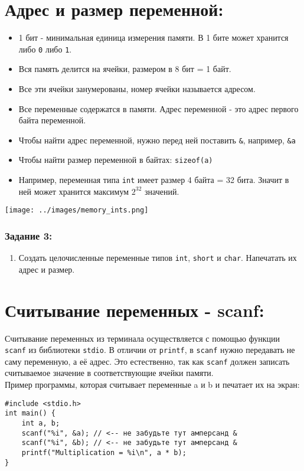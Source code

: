 \documentclass{article}
\begin{document}
\section*{Адрес и размер переменной:}
\begin{itemize}
\item 1 бит - минимальная единица измерения памяти. В 1 бите может хранится либо \texttt{0} либо \texttt{1}.
\item Вся память делится на ячейки, размером в 8 бит = 1 байт.
\item Все эти ячейки занумерованы, номер ячейки называется адресом.
\item Все переменные содержатся в памяти. Адрес переменной - это адрес первого байта переменной.
\item Чтобы найти адрес переменной, нужно перед ней поставить \texttt{\&}, например, \texttt{\&a}
\item Чтобы найти размер переменной в байтах: \texttt{sizeof(a)}
\item Например, переменная типа \texttt{int} имеет размер 4 байта = 32 бита. Значит в ней может хранится максимум $2^{32}$ значений.
\end{itemize}

\texttt{[image: ../images/memory\_ints.png]}

\subsubsection*{Задание 3:}
\begin{enumerate}
\item Создать целочисленные переменные типов \texttt{int}, \texttt{short} и \texttt{char}. Напечатать их адрес и размер.
\end{enumerate}

\section*{Считывание переменных - scanf:}
Считывание переменных из терминала осуществляется с помощью функции \texttt{scanf} из библиотеки \texttt{stdio}. В отличии от \texttt{printf}, в \texttt{scanf} нужно передавать не саму переменную, а её адрес. Это естественно, так как \texttt{scanf} должен записать считываемое значение в соответствующие ячейки памяти.\\
Пример программы, которая считывает переменные a и b и печатает их на экран:
\begin{lstlisting}
#include <stdio.h>
int main() {
    int a, b;
    scanf("%i", &a); // <-- не забудьте тут амперсанд &
    scanf("%i", &b); // <-- не забудьте тут амперсанд &
    printf("Multiplication = %i\n", a * b);
}
\end{lstlisting}
\end{document}
